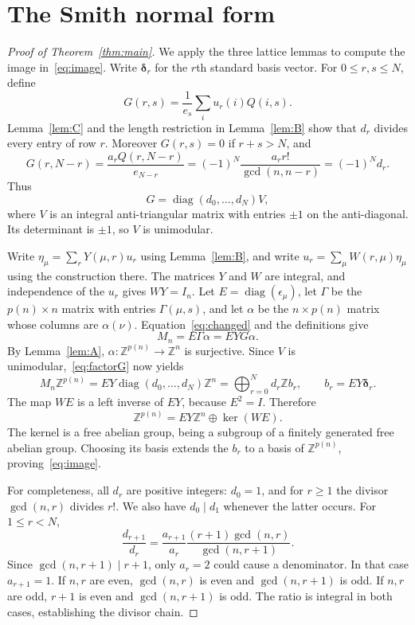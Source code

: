 \documentclass[11pt]{article}
\theoremstyle{remark}
\newcommand{\Z}{\mathbb{Z}}
\newcommand{\diag}{\operatorname{diag}}
\begin{document}
\section{The Smith normal form}\label{sec:assembly}
\begin{proof}[Proof of Theorem~\ref{thm:main}]
We apply the three lattice lemmas to compute the image in~\eqref{eq:image}.
Write $\boldsymbol\delta_r$ for the $r$th standard basis vector.
For $0\leq r,s\leq N$, define
\[
 G(r,s)=\frac1{e_s}\sum_i u_r(i)Q(i,s).
\]
Lemma~\ref{lem:C} and the length restriction in Lemma~\ref{lem:B}
show that $d_r$ divides every entry of row $r$. Moreover $G(r,s)=0$
if $r+s>N$, and
\[
 G(r,N-r)=\frac{a_rQ(r,N-r)}{e_{N-r}}
         =(-1)^N\frac{a_rr!}{\gcd(n,n-r)}=(-1)^Nd_r.
\]
Thus
\begin{equation}\label{eq:factorG}
 G=\diag(d_0,\ldots,d_N)V,
\end{equation}
where $V$ is an integral anti-triangular matrix with entries $\pm1$
on the anti-diagonal. Its determinant is $\pm1$, so $V$ is unimodular.

Write $\eta_\mu=\sum_r Y(\mu,r)u_r$ using Lemma~\ref{lem:B}, and
write $u_r=\sum_\mu W(r,\mu)\eta_\mu$ using the construction there.
The matrices $Y$ and $W$ are integral, and independence of the $u_r$
gives $WY=I_n$. Let $E=\diag(\epsilon_\mu)$, let $\Gamma$ be the
$p(n)\times n$ matrix with entries $\Gamma(\mu,s)$, and let $\alpha$ be
the $n\times p(n)$ matrix whose columns are $\alpha(\nu)$. Equation~\eqref{eq:changed}
and the definitions give
\[
 M_n=E\Gamma\alpha=EYG\alpha.
\]
By Lemma~\ref{lem:A}, $\alpha:\Z^{p(n)}\to\Z^n$ is surjective.
Since $V$ is unimodular,~\eqref{eq:factorG} now yields
\[
 M_n\Z^{p(n)}=EY\diag(d_0,\ldots,d_N)\Z^n
             =\bigoplus_{r=0}^N d_r\Z b_r,
 \qquad b_r=EY\boldsymbol\delta_r.
\]
The map $WE$ is a left inverse of $EY$, because $E^2=I$.
Therefore
\[
 \Z^{p(n)}=EY\Z^n\oplus\ker(WE).
\]
The kernel is a free abelian group, being a subgroup of a finitely
generated free abelian group. Choosing its basis extends the $b_r$
to a basis of $\Z^{p(n)}$, proving~\eqref{eq:image}.

For completeness, all $d_r$ are positive integers: $d_0=1$, and for
$r\geq1$ the divisor $\gcd(n,r)$ divides $r!$. We also have
$d_0\mid d_1$ whenever the latter occurs. For $1\leq r<N$,
\[
 \frac{d_{r+1}}{d_r}
 =\frac{a_{r+1}}{a_r}\frac{(r+1)\gcd(n,r)}{\gcd(n,r+1)}.
\]
Since $\gcd(n,r+1)\mid r+1$, only $a_r=2$ could cause a
denominator. In that case $a_{r+1}=1$. If $n,r$ are even,
$\gcd(n,r)$ is even and $\gcd(n,r+1)$ is odd. If $n,r$ are odd,
$r+1$ is even and $\gcd(n,r+1)$ is odd. The ratio is integral
in both cases, establishing the divisor chain.


\end{proof}
\end{document}

